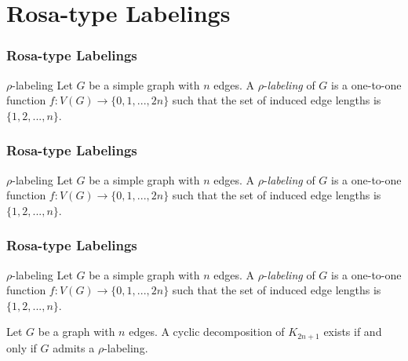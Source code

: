 \documentclass[11pt,serif,professionalfont,aspectratio=169]{beamer}
\newcommand{\vertex}{\node[vertex]}
\theoremstyle{plain}
\begin{document}
\section{Rosa-type Labelings}

\begin{frame}
\frametitle{Rosa-type Labelings}
\begin{block}{$\rho$-labeling}
Let $G$ be a simple graph with $n$ edges. A $\rho$-\emph{labeling} of $G$ is a one-to-one function $f:V(G) \rightarrow \{0,1,...,2n\}$ such that the set of induced edge lengths is $\{1,2,...,n\}.$
\end{block}
\begin{center}
\end{center}

\end{frame}
\begin{frame}
\frametitle{Rosa-type Labelings}
\begin{block}{$\rho$-labeling}
Let $G$ be a simple graph with $n$ edges. A $\rho$-\emph{labeling} of $G$ is a one-to-one function $f:V(G) \rightarrow \{0,1,...,2n\}$ such that the set of induced edge lengths is $\{1,2,...,n\}.$
\end{block}
\begin{center}
\end{center}
\end{frame}

\begin{frame}
\frametitle{Rosa-type Labelings}
\begin{block}{$\rho$-labeling}
Let $G$ be a simple graph with $n$ edges. A $\rho$-\emph{labeling} of $G$ is a one-to-one function $f:V(G) \rightarrow \{0,1,...,2n\}$ such that the set of induced edge lengths is $\{1,2,...,n\}.$
\end{block}
\begin{theorem}[Rosa, 1967]
Let $G$ be a graph with $n$ edges. A cyclic decomposition of $K_{2n+1}$ exists if and only if $G$ admits a $\rho$-labeling.
\end{theorem}
\end{frame}
\end{document}
